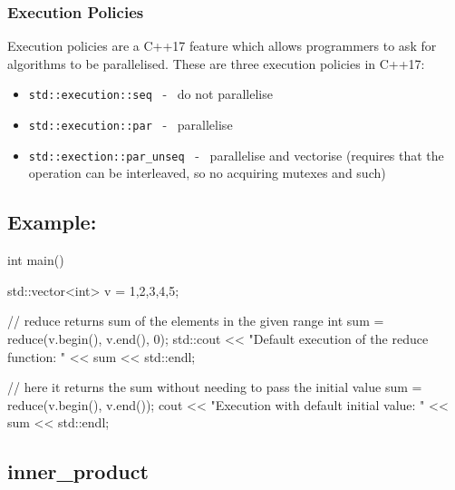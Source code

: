\documentclass{report}
\begin{document}
\subsubsection*{Execution Policies}
Execution policies are a C++17 feature which allows programmers to ask for algorithms to be parallelised. These are three execution policies in C++17:
\begin{itemize}
    \item \texttt{std::execution::seq} \ - \ do not parallelise
    \item \texttt{std::execution::par} \ - \ parallelise
    \item \texttt{std::exection::par\_unseq} \ - \ parallelise and vectorise (requires that the operation can be interleaved, so no acquiring mutexes and such)
\end{itemize} 
\subsection*{Example:} 
\begin{cppcode}
  
int main() {
    std::vector<int> v = {1,2,3,4,5};

    // reduce returns sum of the elements in the given range
    int sum = reduce(v.begin(), v.end(), 0); 
    std::cout << "Default execution of the reduce function: " <<  sum << std::endl;

    // here it returns the sum without needing to pass the initial value
    sum = reduce(v.begin(), v.end());
    cout << "Execution with default initial value: " << sum << std::endl;
}
\end{cppcode}
\subsection{inner\_product}
\end{document}
